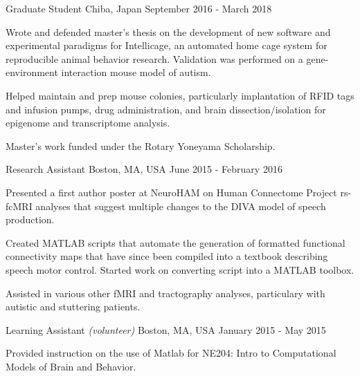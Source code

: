 \begin{cventries}
    {Graduate Student}
    {Chiba, Japan}
    {September 2016 - March 2018}
    {\begin{cvitems}
        \item{Wrote and defended master's thesis on the development of new software and
            experimental paradigms for Intellicage, an automated home cage system for
            reproducible animal behavior research. Validation was performed on a
            gene-environment interaction mouse model of autism.\vspace*{0.1cm}}
        \item{Helped maintain and prep mouse colonies, particularly implantation of RFID
            tags and infusion pumps, drug administration, and brain dissection/isolation
            for epigenome and transcriptome analysis.\vspace*{0.1cm}}
        \item{Master's work funded under the Rotary Yoneyama Scholarship.}
    \end{cvitems}}
    \vspace*{0.2cm}
    
    {Research Assistant}
    {Boston, MA, USA}
    {June 2015 - February 2016}
    {\begin{cvitems}
        \item{Presented a first author poster at NeuroHAM on Human Connectome Project
            rs-fcMRI analyses that suggest multiple changes to the DIVA model of speech
            production.\vspace*{0.1cm}}
        \item{Created MATLAB scripts that automate the generation of formatted functional
            connectivity maps that have since been compiled into a textbook describing
            speech motor control. Started work on converting script into a MATLAB
            toolbox.\vspace*{0.1cm}}
        \item{Assisted in various other fMRI and tractography analyses, particulary
            with autistic and stuttering patients.}
    \end{cvitems}}
    \vspace*{0.2cm}
    
    {Learning Assistant \textnormal{\small{\textit{(volunteer)}}}}
    {Boston, MA, USA}
    {January 2015 - May 2015}
    {\begin{cvitems}
        \item{Provided instruction on the use of Matlab for NE204: Intro to Computational
            Models of Brain and Behavior.}
    \end{cvitems}}
    \vspace*{0.2cm}
    

\end{cventries}

